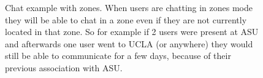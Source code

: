 \begin{figure}
\caption{Chat example with zones.  When users are chatting in zones mode they will be able to chat in a zone even if they are not currently located in that zone. So for example if 2 users were present at ASU and afterwards one user went to UCLA  (or anywhere) they would still be able to communicate for a few days, because of their previous association with ASU.  }
\label{zones}
\end{figure}

